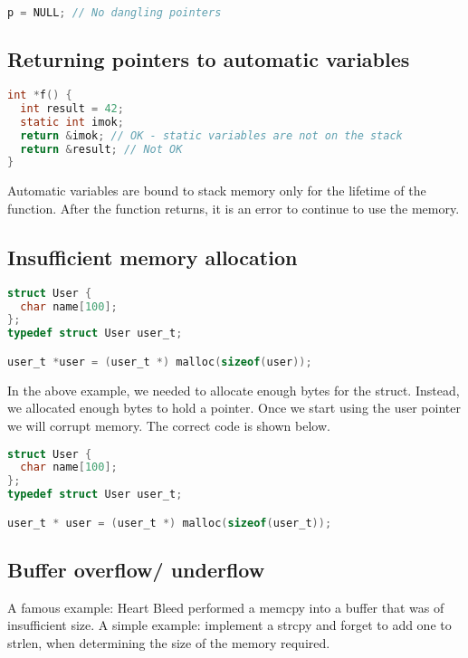 \begin{lstlisting}[language=C]
p = NULL; // No dangling pointers
\end{lstlisting}

\subsection{Returning pointers to automatic variables}

\begin{lstlisting}[language=C]
int *f() {
  int result = 42;
  static int imok;
  return &imok; // OK - static variables are not on the stack
  return &result; // Not OK
}
\end{lstlisting}

Automatic variables are bound to stack memory only for the lifetime of the function.
After the function returns, it is an error to continue to use the memory.

\subsection{Insufficient memory allocation}

\begin{lstlisting}[language=C]
struct User {
  char name[100];
};
typedef struct User user_t;

user_t *user = (user_t *) malloc(sizeof(user));
\end{lstlisting}

In the above example, we needed to allocate enough bytes for the struct.
Instead, we allocated enough bytes to hold a pointer.
Once we start using the user pointer we will corrupt memory.
The correct code is shown below.

\begin{lstlisting}[language=C]
struct User {
  char name[100];
};
typedef struct User user_t;

user_t * user = (user_t *) malloc(sizeof(user_t));
\end{lstlisting}

\subsection{Buffer overflow/ underflow}

A famous example: Heart Bleed performed a memcpy into a buffer that was of insufficient size.
A simple example: implement a strcpy and forget to add one to strlen, when determining the size of the memory required.

